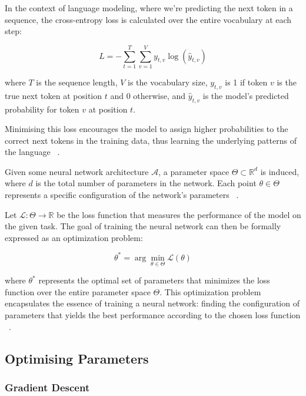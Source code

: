 \documentclass[a4paper, oneside]{discothesis}
\begin{document}
In the context of language modeling, where we're predicting the next token in a sequence, the cross-entropy loss is calculated over the entire vocabulary at each step:

\begin{equation}
    L = -\sum_{t=1}^T \sum_{v=1}^V y_{t,v} \log(\hat{y}_{t,v})
\end{equation}

where $T$ is the sequence length, $V$ is the vocabulary size, $y_{t,v}$ is 1 if token $v$ is the true next token at position $t$ and 0 otherwise, and $\hat{y}_{t,v}$ is the model's predicted probability for token $v$ at position $t$.

Minimising this loss encourages the model to assign higher probabilities to the correct next tokens in the training data, thus learning the underlying patterns of the language ~\cite{bengio2003neural}.

Given some neural network architecture $\mathcal{A}$, a parameter space $\Theta \subset \mathbb{R}^d$ is induced, where $d$ is the total number of parameters in the network. Each point $\theta \in \Theta$ represents a specific configuration of the network's parameters ~\cite{lecun2015deep}.

Let $\mathcal{L}: \Theta \rightarrow \mathbb{R}$ be the loss function that measures the performance of the model on the given task. The goal of training the neural network can then be formally expressed as an optimization problem:

\begin{equation}
    \theta^* = \arg\min_{\theta \in \Theta} \mathcal{L}(\theta)
\end{equation}

where $\theta^*$ represents the optimal set of parameters that minimizes the loss function over the entire parameter space $\Theta$. This optimization problem encapsulates the essence of training a neural network: finding the configuration of parameters that yields the best performance according to the chosen loss function ~\cite{rumelhart1986learning}.


\subsection{Optimising Parameters}

\subsubsection{Gradient Descent}
\end{document}
